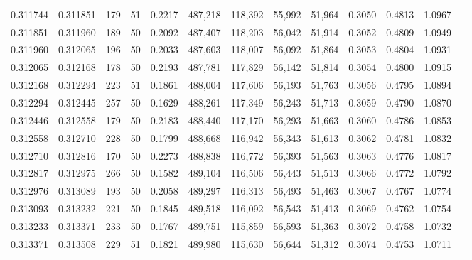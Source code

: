 \begin{tabular}{rrrrrrrrrrrrr}
0.311744 & 0.311851 &   179 &  51 &                                     0.2217 & 487,218 & 118,392 &  55,992 &  51,964 & 0.3050 & 0.4813 & 1.0967 \\
0.311851 & 0.311960 &   189 &  50 &                                     0.2092 & 487,407 & 118,203 &  56,042 &  51,914 & 0.3052 & 0.4809 & 1.0949 \\
0.311960 & 0.312065 &   196 &  50 &                                     0.2033 & 487,603 & 118,007 &  56,092 &  51,864 & 0.3053 & 0.4804 & 1.0931 \\
0.312065 & 0.312168 &   178 &  50 &                                     0.2193 & 487,781 & 117,829 &  56,142 &  51,814 & 0.3054 & 0.4800 & 1.0915 \\
0.312168 & 0.312294 &   223 &  51 &                                     0.1861 & 488,004 & 117,606 &  56,193 &  51,763 & 0.3056 & 0.4795 & 1.0894 \\
0.312294 & 0.312445 &   257 &  50 &                                     0.1629 & 488,261 & 117,349 &  56,243 &  51,713 & 0.3059 & 0.4790 & 1.0870 \\
0.312446 & 0.312558 &   179 &  50 &                                     0.2183 & 488,440 & 117,170 &  56,293 &  51,663 & 0.3060 & 0.4786 & 1.0853 \\
0.312558 & 0.312710 &   228 &  50 &                                     0.1799 & 488,668 & 116,942 &  56,343 &  51,613 & 0.3062 & 0.4781 & 1.0832 \\
0.312710 & 0.312816 &   170 &  50 &                                     0.2273 & 488,838 & 116,772 &  56,393 &  51,563 & 0.3063 & 0.4776 & 1.0817 \\
0.312817 & 0.312975 &   266 &  50 &                                     0.1582 & 489,104 & 116,506 &  56,443 &  51,513 & 0.3066 & 0.4772 & 1.0792 \\
0.312976 & 0.313089 &   193 &  50 &                                     0.2058 & 489,297 & 116,313 &  56,493 &  51,463 & 0.3067 & 0.4767 & 1.0774 \\
0.313093 & 0.313232 &   221 &  50 &                                     0.1845 & 489,518 & 116,092 &  56,543 &  51,413 & 0.3069 & 0.4762 & 1.0754 \\
0.313233 & 0.313371 &   233 &  50 &                                     0.1767 & 489,751 & 115,859 &  56,593 &  51,363 & 0.3072 & 0.4758 & 1.0732 \\
0.313371 & 0.313508 &   229 &  51 &                                     0.1821 & 489,980 & 115,630 &  56,644 &  51,312 & 0.3074 & 0.4753 & 1.0711 \\

\end{tabular}
